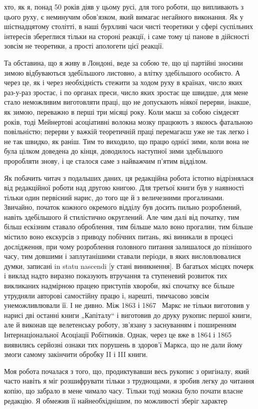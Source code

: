 \parcont{}  %
хто, як я, понад 50 років діяв у цьому русі, для того роботи,
що випливають з цього руху, є неминучим обов’язком, який
вимагає негайного виконання. Як у шістнадцятому столітті, в
наші бурхливі часи чисті теоретики у сфері суспільних інтересів
збереглися тільки на стороні реакції, і саме тому ці панове
в дійсності зовсім не теоретики, а прості апологети цієї реакції.

Та обставина, що я живу в Лондоні, веде за собою те, що
ці партійні зносини зимою відбуваються здебільшого листовно,
а влітку здебільшого особисто. А через це, як і через необхідність
стежити за ходом руху в країнах, число яких раз-у-раз
зростає, і по органах преси, число яких зростає ще швидше, для
мене стало неможливим виготовляти праці, що не допускають
ніякої перерви, інакше, як зимою, переважно в перші три місяці
року. Коли маєш за собою сімдесят років, тоді Мейнертові асоціативні
волокна мозку працюють з якоюсь фатальною повільністю;
перерви у важкій теоретичній праці перемагаєш уже не так
легко і не так швидко, як раніш. Тим то виходило, що працю
однієї зими, коли вона не була цілком доведена до кінця, доводилось
наступної зими здебільшого проробляти знову, і це сталося
саме з найважчим п’ятим відділом.

Як побачить читач з подальших даних, ця редакційна робота
істотно відрізнялася від редакційної роботи над другою книгою.
Для третьої книги був у наявності тільки один первісний нарис,
до того ще й з величезними прогалинами. Звичайно, початок
кожного окремого відділу був досить пильно розроблений,
навіть здебільшого й стилістично округлений. Але чим далі від
початку, тим більш ескізним ставало оброблення, тим більше мало
воно прогалин, тим більше містило воно екскурсів з приводу побічних
питань, які виникали в процесі дослідження, при чому розроблення
головного питання залишалося до пізнішого часу, тим
довшими і заплутанішими ставали періоди, в яких висловлювалися
думки, записані in statu nascendi [у стані виникнення].
В багатьох місцях почерк і виклад надто виразно показують
втручання та ступеневий розвиток тих викликаних надмірною
працею приступів хвороби, які спочатку все більше утрудняли
авторові самостійну працю і, нарешті, тимчасово зовсім унеможливлювали
її. І не дивно. Між 1863 і 1867~ Маркс не тільки
виготовив у нарисі дві останні книги „Капіталу“ і виготовив до
друку рукопис першої книги, але й виконав ще велетенську
роботу, зв’язану з заснуванням і поширенням Інтернаціональної
Асоціації Робітників. Однак, через це вже в 1864 і 1865~
виявились серйозні ознаки тих порушень в здоров’ї Маркса, що
не дали йому змоги самому закінчити обробку II і III книги.

Моя робота почалася з того, що, продиктувавши весь рукопис
з оригіналу, який часто навіть я міг розшифрувати тільки з труднощами,
я зробив легку до читання копію, що забрало в мене
чимало часу. Тільки тоді можна було почати власне редакцію.
Я обмежив її найнеобхіднішим, по можливості зберіг характер
\parbreak{}  %
